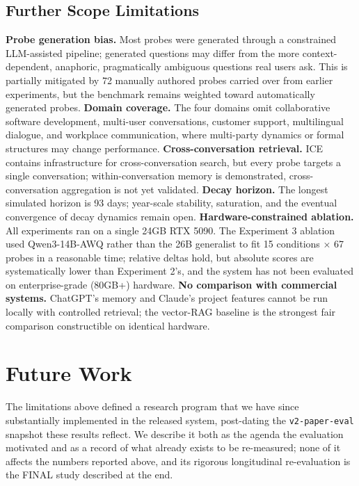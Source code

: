 \documentclass[10pt]{article}
\begin{document}
\subsection{Further Scope Limitations}
\textbf{Probe generation bias.} Most probes were generated through a constrained LLM-assisted pipeline; generated questions may differ from the more context-dependent, anaphoric, pragmatically ambiguous questions real users ask. This is partially mitigated by 72 manually authored probes carried over from earlier experiments, but the benchmark remains weighted toward automatically generated probes. \textbf{Domain coverage.} The four domains omit collaborative software development, multi-user conversations, customer support, multilingual dialogue, and workplace communication, where multi-party dynamics or formal structures may change performance. \textbf{Cross-conversation retrieval.} ICE contains infrastructure for cross-conversation search, but every probe targets a single conversation; within-conversation memory is demonstrated, cross-conversation aggregation is not yet validated. \textbf{Decay horizon.} The longest simulated horizon is 93 days; year-scale stability, saturation, and the eventual convergence of decay dynamics remain open. \textbf{Hardware-constrained ablation.} All experiments ran on a single 24GB RTX 5090. The Experiment 3 ablation used Qwen3-14B-AWQ rather than the 26B generalist to fit 15 conditions $\times$ 67 probes in a reasonable time; relative deltas hold, but absolute scores are systematically lower than Experiment 2's, and the system has not been evaluated on enterprise-grade (80GB+) hardware. \textbf{No comparison with commercial systems.} ChatGPT's memory and Claude's project features cannot be run locally with controlled retrieval; the vector-RAG baseline is the strongest fair comparison constructible on identical hardware.

\section{Future Work}
\label{sec:future-work}

The limitations above defined a research program that we have since substantially implemented in the released system, post-dating the \texttt{v2-paper-eval} snapshot these results reflect. We describe it both as the agenda the evaluation motivated and as a record of what already exists to be re-measured; none of it affects the numbers reported above, and its rigorous longitudinal re-evaluation is the FINAL study described at the end.
\end{document}
